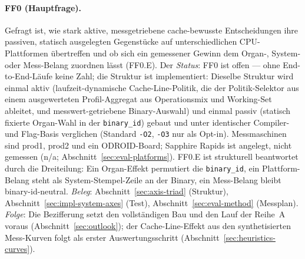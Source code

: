 \begin{nurkurz}
\paragraph{FF0 (Hauptfrage).} Gefragt ist, wie stark aktive, messgetriebene cache-bewusste Entscheidungen
ihre passiven, statisch ausgelegten Gegenstücke auf unterschiedlichen CPU-Plattformen übertreffen und ob
sich
ein gemessener Gewinn dem Organ-, System- oder Mess-Belang zuordnen lässt (FF0.E). Der \emph{Status}: FF0
ist
offen --- ohne End-to-End-Läufe keine Zahl; die Struktur ist implementiert: Dieselbe Struktur wird einmal
aktiv (laufzeit-dynamische Cache-Line-Politik, die der Politik-Selektor aus einem ausgewerteten
Profil-Aggregat aus Operationsmix und Working-Set ableitet, und
messwert-getriebene Binary-Auswahl) und einmal passiv (statisch fixierte Organ-Wahl in der
\texttt{binary\_id}) gebaut und unter identischer Compiler- und Flag-Basis verglichen (Standard
\texttt{-O2}, \texttt{-O3} nur als Opt-in). Messmaschinen sind prod1, prod2 und ein ODROID-Board; Sapphire
Rapids ist angelegt, nicht gemessen (n/a; Abschnitt~\ref{sec:eval-platforms}). FF0.E ist strukturell
beantwortet durch die Dreiteilung: Ein Organ-Effekt permutiert die \texttt{binary\_id}, ein
Plattform-Belang steht als System-Stempel-Zeile an der Binary, ein Mess-Belang bleibt binary-id-neutral.
\emph{Beleg}: Abschnitt~\ref{sec:axis-triad} (Struktur), Abschnitt~\ref{sec:impl-system-axes} (Test),
Abschnitt~\ref{sec:eval-method} (Messplan).
\emph{Folge}: Die Bezifferung setzt den vollständigen Bau und den Lauf der Reihe~A voraus
(Abschnitt~\ref{sec:outlook}); der Cache-Line-Effekt aus den synthetisierten Mess-Kurven folgt als erster
Auswertungsschritt (Abschnitt~\ref{sec:heuristics-curves}).
\end{nurkurz}

